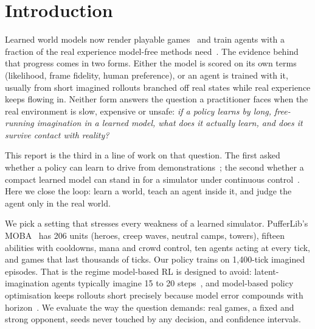 \documentclass[11pt]{article}
\begin{document}
\section{Introduction}
\label{sec:intro}

Learned world models now render playable games~\cite{valevski2025gamengen,bruce2024genie,alonso2024diamond} and train agents with a fraction of the real experience model-free methods need~\cite{hafner2025dreamerv3,micheli2023iris,alonso2024diamond}. The evidence behind that progress comes in two forms. Either the model is scored on its own terms (likelihood, frame fidelity, human preference), or an agent is trained with it, usually from short imagined rollouts branched off real states while real experience keeps flowing in. Neither form answers the question a practitioner faces when the real environment is slow, expensive or unsafe: \emph{if a policy learns by long, free-running imagination in a learned model, what does it actually learn, and does it survive contact with reality?}

This report is the third in a line of work on that question. The first asked whether a policy can learn to drive from demonstrations~\cite{kieto2026carla}; the second whether a compact learned model can stand in for a simulator under continuous control~\cite{kieto2026neuralsim}. Here we close the loop: learn a world, teach an agent inside it, and judge the agent only in the real world.

We pick a setting that stresses every weakness of a learned simulator. PufferLib's MOBA~\cite{suarez2024pufferlib} has 206 units (heroes, creep waves, neutral camps, towers), fifteen abilities with cooldowns, mana and crowd control, ten agents acting at every tick, and games that last thousands of ticks. Our policy trains on 1,400-tick imagined episodes. That is the regime model-based RL is designed to avoid: latent-imagination agents typically imagine 15 to 20 steps~\cite{hafner2020dreamer,micheli2023iris}, and model-based policy optimisation keeps rollouts short precisely because model error compounds with horizon~\cite{janner2019mbpo,talvitie2017self}. We evaluate the way the question demands: real games, a fixed and strong opponent, seeds never touched by any decision, and confidence intervals.
\end{document}
